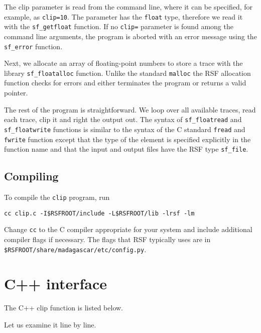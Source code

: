  
The clip parameter is read from the command line, where it can be
specified, for example, as \texttt{clip=10}. The parameter has the
\texttt{float} type, therefore we read it with the
\texttt{sf\_getfloat} function. If no \texttt{clip=} parameter is
found among the command line arguments, the program is aborted with an
error message using the \texttt{sf\_error} function.

 
Next, we allocate an array of floating-point numbers to store a trace
with the library \texttt{sf\_floatalloc} function. Unlike the standard
\texttt{malloc} the RSF allocation function checks for errors and
either terminates the program or returns a valid pointer.

 
The rest of the program is straightforward. We loop over all available
traces, read each trace, clip it and right the output out. The syntax
of \texttt{sf\_floatread} and \texttt{sf\_floatwrite} functions is
similar to the syntax of the C standard \texttt{fread} and
\texttt{fwrite} function except that the type of the element is
specified explicitly in the function name and that the input and
output files have the RSF type \texttt{sf\_file}.

\subsection{Compiling}

To compile the \texttt{clip} program, run
\begin{verbatim}
cc clip.c -I$RSFROOT/include -L$RSFROOT/lib -lrsf -lm
\end{verbatim}
Change \texttt{cc} to the C compiler appropriate for your system and include
additional compiler flags if necessary. The flags that RSF typically uses are
in \\ \texttt{\$RSFROOT/share/madagascar/etc/config.py}.

\section{C++ interface}

\lstset{language=c++}
\renewcommand{\rsfclip}{\RSF/api/c++/test/clip.cc}

The C++ clip function is listed below.


Let us examine it line by line. 

